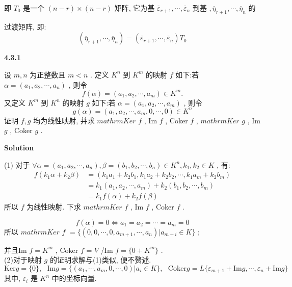 \documentclass[11pt,a4paper,openany,oneside]{book}
\newcommand\Solution{\noindent\textbf{\textsf{Solution}}\par\medskip}
\begin{document}
即 $ T_0 $ 是一个 $ (n-r)\times(n-r) $ 矩阵, 它为基 $  \overline{\varepsilon}_{r+1}, \cdots, \overline{\varepsilon}_n  $ 到基 $  ,  \overline{\eta}_{r+1}, \cdots, \overline{\eta}_n  $ 的

过渡矩阵, 即:
 $$  (\overline{\eta}_{r+1}, \cdots, \overline{\eta}_{n}) = (\overline{\varepsilon}_{r+1}, \cdots, \overline{\varepsilon}_{n})T_0  $$  

\begin{myexample}
	\textbf{4.3.1}

设 $ m,n $ 为正整数且 $ m<n $ . 定义 $ K^n $ 到 $ K^m $ 的映射 $ f $ 如下:若 $ \alpha = (a_1, a_2, \cdots, a_n) $ , 则令
 $$  f(\alpha) = (a_1, a_2, \cdots, a_m) \in K^m.  $$ 
又定义 $ K^m $ 到 $ K^n $ 的映射 $ g $ 如下:若 $ \alpha = (a_1, a_2, \cdots, a_m) $ , 则令
 $$  g(\alpha) = (a_1, a_2, \cdots, a_m, 0, \cdots, 0) \in K^n  $$ 
证明 $ f,g $ 均为线性映射, 并求 $mathrm{Ker}$  $ f $ , Im $ f $ , Coker $ f $ ,  $mathrm{Ker}$  $ g $ , Im $ g $ , Coker $ g $ .  \\ 

\end{myexample}
\Solution 

(1) 对于 $ \forall \alpha=(a_1, a_2, \cdots, a_n), \beta=(b_1, b_2, \cdots, b_n) \in K^n, k_1, k_2 \in K $ , 有:
\begin{align*}
f(k_1\alpha + k_2\beta) &= (k_1a_1+k_2b_1, k_1a_2+k_2b_2, \cdots, k_1a_m+k_2b_m) \\
&= k_1(a_1, a_2, \cdots, a_m) + k_2(b_1, b_2, \cdots, b_m) \\
&= k_1f(\alpha) + k_2f(\beta) 
\end{align*}
所以 $ f $ 为线性映射. 下求 $mathrm{Ker}$  $ f $ , Im $ f $ , Coker $ f $ . 

 $$  f(\alpha)=0  \Leftrightarrow a_1 = a_2 = \cdots = a_m = 0  $$ 
所以 $mathrm{Ker}$  $ f $   $ = \{(0,0,\cdots, 0, a_{m+1}, \cdots, a_n) | a_{m+i} \in K \} $ ;

并且Im $ f = K^m $ , Coker $ f $  =  $ V $ /Im $ f = \{ 0 + K^m\} $ .  \\ 

(2)对于映射 $ g $ 的证明求解与(1)类似, 便不赘述.
 $$   \mathrm{Ker} g = \{ 0 \}, \ \ \  \mathrm{Im} g = \{(a_1, \cdots, a_m, 0, \cdots, 0)|a_i \in K \}, \ \ \   \mathrm{Coker} g = L \{ \varepsilon_{m+1}+ \mathrm{Im} g, \cdots, \varepsilon_n +  \mathrm{Im} g \}  $$  
其中,  $ \varepsilon_i $ 是 $ K^n $ 中的坐标向量. \\  \\  \\
\end{document}
